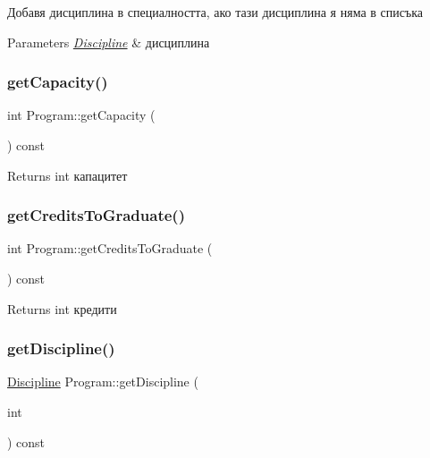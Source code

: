 Добавя дисциплина в специалността, ако тази дисциплина я няма в списъка 


\begin{DoxyParams}{Parameters}
{\em \hyperlink{class_discipline}{Discipline}} & дисциплина \\
\hline
\end{DoxyParams}
\mbox{\label{class_program_a72ea2125e1081701884ba85e9bc9eb73}} 
\subsubsection{\texorpdfstring{get\+Capacity()}{getCapacity()}}
{\footnotesize\ttfamily int Program\+::get\+Capacity (\begin{DoxyParamCaption}{ }\end{DoxyParamCaption}) const}

\begin{DoxyReturn}{Returns}
int капацитет 
\end{DoxyReturn}
\mbox{\label{class_program_a0cfb4743be3207cc4bf89f04b1c8ee50}} 
\subsubsection{\texorpdfstring{get\+Credits\+To\+Graduate()}{getCreditsToGraduate()}}
{\footnotesize\ttfamily int Program\+::get\+Credits\+To\+Graduate (\begin{DoxyParamCaption}{ }\end{DoxyParamCaption}) const}

\begin{DoxyReturn}{Returns}
int кредити 
\end{DoxyReturn}
\mbox{\label{class_program_a76f3e2bc8956ccd0996caab3a1757092}} 
\subsubsection{\texorpdfstring{get\+Discipline()}{getDiscipline()}}
{\footnotesize\ttfamily \hyperlink{class_discipline}{Discipline} Program\+::get\+Discipline (\begin{DoxyParamCaption}\item[{int}]{ }\end{DoxyParamCaption}) const}



